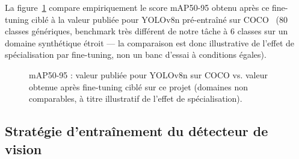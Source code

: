 \documentclass[12pt,a4paper,titlepage]{article}
\begin{document}
La figure~\ref{fig:chart_map} compare empiriquement le score mAP50-95 obtenu après ce fine-tuning ciblé à la valeur publiée pour YOLOv8n pré-entraîné sur COCO~\cite{ultralytics_yolov8} (80 classes génériques, benchmark très différent de notre tâche à 6 classes sur un domaine synthétique étroit --- la comparaison est donc illustrative de l'effet de spécialisation par fine-tuning, non un banc d'essai à conditions égales).

\begin{figure}[H]
    \centering
    \caption{mAP50-95 : valeur publiée pour YOLOv8n sur COCO vs. valeur obtenue après fine-tuning ciblé sur ce projet (domaines non comparables, à titre illustratif de l'effet de spécialisation).}
    \label{fig:chart_map}
\end{figure}

\subsection{Stratégie d'entraînement du détecteur de vision}
\label{subsec:choix_vision_strategie}
\end{document}
